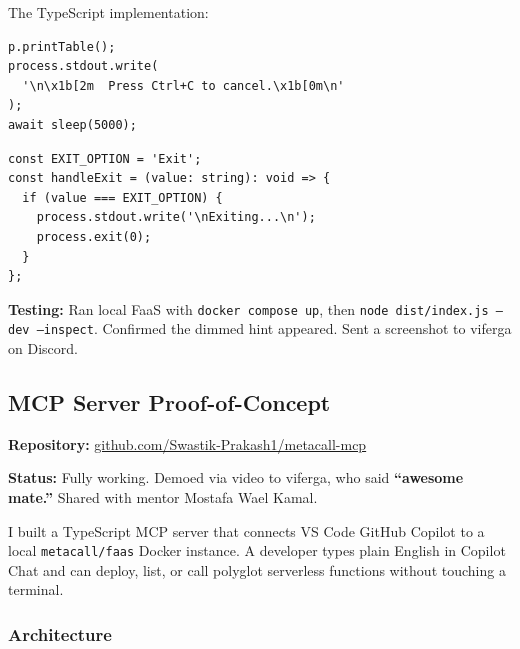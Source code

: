 \documentclass[12pt, a4paper]{article}
\begin{document}
The TypeScript implementation:

\begin{lstlisting}[caption={inspect.ts -- Ctrl+C hint},
  style=tsStyle]
p.printTable();
process.stdout.write(
  '\n\x1b[2m  Press Ctrl+C to cancel.\x1b[0m\n'
);
await sleep(5000);
\end{lstlisting}

\begin{lstlisting}[caption={selection.ts -- Exit option},
  style=tsStyle]
const EXIT_OPTION = 'Exit';
const handleExit = (value: string): void => {
  if (value === EXIT_OPTION) {
    process.stdout.write('\nExiting...\n');
    process.exit(0);
  }
};
\end{lstlisting}

\textbf{Testing:} Ran local FaaS with \texttt{docker compose up}, then
\texttt{node dist/index.js --dev --inspect}. Confirmed the dimmed hint
appeared. Sent a screenshot to viferga on Discord.

\newpage
\subsection{MCP Server Proof-of-Concept}

\textbf{Repository:}
\href{https://github.com/Swastik-Prakash1/metacall-mcp}%
{github.com/Swastik-Prakash1/metacall-mcp}

\textbf{Status:} Fully working. Demoed via video to viferga, who said
\textbf{``awesome mate.''} Shared with mentor Mostafa Wael Kamal.

I built a TypeScript MCP server that connects VS Code GitHub Copilot
to a local \texttt{metacall/faas} Docker instance. A developer types
plain English in Copilot Chat and can deploy, list, or call polyglot
serverless functions without touching a terminal.

\subsubsection{Architecture}
\end{document}
